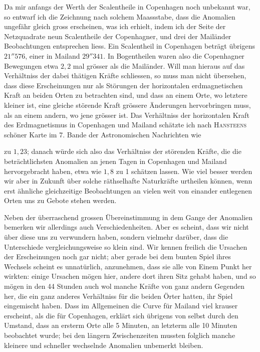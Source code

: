 Da mir anfangs der Werth der Scalentheile in Copenhagen noch unbekannt war, so entwarf ich die Zeichnung nach solchem Maassstabe, dass die Anomalien ungefähr gleich gross erscheinen, was ich erhielt, indem ich der Seite der Netzquadrate neun Scalentheile der Copenhagner, und drei der Mailänder Beobachtungen entsprechen liess. Ein Scalentheil in Copenhagen beträgt übrigens $21''576$, einer in Mailand $29''341$. In Bogentheilen waren also die Copenhagner Bewegungen etwa $2{,}2$ mal grösser als die Mailänder. Will man hieraus auf das Verhältniss der dabei thätigen Kräfte schliessen, so muss man nicht übersehen, dass diese Erscheinungen nur als Störungen der horizontalen erdmagnetischen Kraft an beiden Orten zu betrachten sind, und dass an einem Orte, wo letztere kleiner ist, eine gleiche störende Kraft grössere Änderungen hervorbringen muss, als an einem andern, wo jene grösser ist. Das Verhältniss der horizontalen Kraft des Erdmagnetismus in Copenhagen und Mailand schätzte ich nach \textsc{Hansteens} schöner Karte im 7. Bande der Astronomischen Nachrichten wie
\par\vfill
\clearpage
\endgroup
{}
 zu $1{,}23$; danach würde sich also das Verhältniss der störenden Kräfte, die die beträchtlichsten Anomalien an jenen Tagen in Copenhagen und Mailand hervorgebracht haben, etwa wie $1{,}8$ zu 1 schätzen lassen. Wie viel besser werden wir aber in Zukunft über solche räthselhafte Naturkräfte urtheilen können, wenn erst ähnliche gleichzeitige Beobachtungen an vielen weit von einander entlegenen Orten uns zu Gebote stehen werden.

Neben der überraschend grossen Übereinstimmung in dem Gange der Anomalien bemerken wir allerdings auch Verschiedenheiten. Aber es scheint, dass wir nicht über diese uns zu verwundern haben, sondern vielmehr darüber, dass die Unterschiede vergleichungsweise so klein sind. Wir kennen freilich die Ursachen der Erscheinungen noch gar nicht; aber gerade bei dem bunten Spiel ihres Wechsels scheint es unnatürlich, anzunehmen, dass sie alle von Einem Punkt her wirkten: einige Ursachen mögen hier, andere dort ihren Sitz gehabt haben, und so mögen in den 44 Stunden auch wol manche Kräfte von ganz andern Gegenden her, die ein ganz anderes Verhältniss für die beiden Örter hatten, ihr Spiel eingemischt haben. Dass im Allgemeinen die Curve für Mailand viel krauser erscheint, als die für Copenhagen, erklärt sich übrigens von selbst durch den Umstand, dass an ersterm Orte alle 5 Minuten, an letzterm alle 10 Minuten beobachtet wurde; bei den längern Zwischenzeiten mussten folglich manche kleinere und schneller wechselnde Anomalien unbemerkt bleiben.

